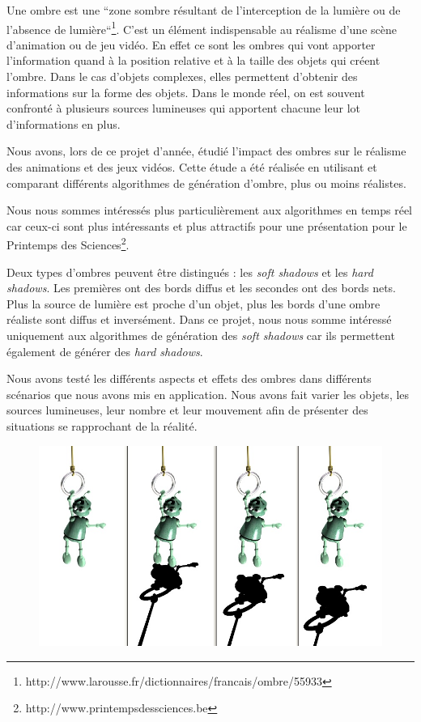 \documentclass[a4paper,10pt]{report}
\begin{document}
Une ombre est une ``zone sombre résultant de l'interception de la lumière ou de l'absence de lumière``\footnote{http://www.larousse.fr/dictionnaires/francais/ombre/55933}. C'est un élément indispensable au réalisme d'une scène d'animation ou de jeu vidéo. En effet ce sont les ombres qui vont apporter l'information quand à la position relative et à la taille des objets qui créent l'ombre. Dans le cas d'objets complexes, elles permettent d'obtenir des informations sur la forme des objets.
Dans le monde réel, on est souvent confronté à plusieurs sources lumineuses qui apportent chacune leur lot d'informations en plus.


Nous avons, lors de ce projet d'année, étudié l'impact des ombres sur le réalisme des animations et des jeux vidéos. Cette étude a été réalisée en utilisant et comparant différents algorithmes de génération d'ombre, plus ou moins réalistes.


Nous nous sommes intéressés plus particulièrement aux algorithmes en temps réel car ceux-ci sont plus intéressants et plus attractifs pour une présentation pour le Printemps des Sciences\footnote{http://www.printempsdessciences.be}.

Deux types d'ombres peuvent être distingués : les \textit{soft shadows} et les \textit{hard shadows}. Les premières ont des bords diffus et les secondes ont des bords nets. Plus la source de lumière est proche d'un objet, plus les bords d'une ombre réaliste sont diffus et inversément.
Dans ce projet, nous nous somme intéressé uniquement aux algorithmes de génération des \textit{soft shadows} car ils permettent également de générer des \textit{hard shadows}.

Nous avons testé les différents aspects et effets des ombres dans différents scénarios que nous avons mis en application. Nous avons fait varier les objets, les sources lumineuses, leur nombre et leur mouvement afin de présenter des situations se rapprochant de la réalité.

\begin{figure}[H]
\includegraphics[scale=0.25]{images/relativePosition.jpg}
\centering
{}
\end{figure}
\end{document}
